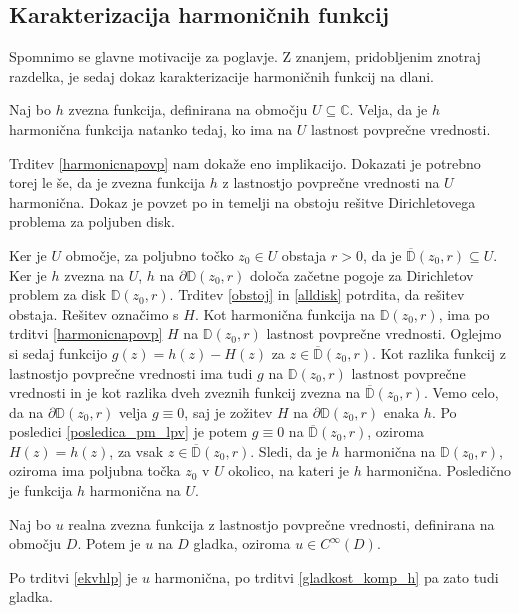 \documentclass[mat1, tisk]{fmfdelo}
\begin{document}
\subsection{Karakterizacija harmoničnih funkcij}
    Spomnimo se glavne motivacije za poglavje.
    Z znanjem, pridobljenim znotraj razdelka, je sedaj dokaz karakterizacije harmoničnih funkcij na dlani.
    
    \begin{trditev}
        \label{ekvhlp}
        Naj bo $h$ zvezna funkcija, definirana na območju $U \subseteq \mathbb{C}$. Velja, da je $h$ harmonična funkcija natanko tedaj, ko ima na $U$ lastnost povprečne vrednosti.
    \end{trditev}
    \begin{dokaz}
        Trditev \ref{harmonicnapovp} nam dokaže eno implikacijo. Dokazati je potrebno torej le še, da je zvezna funkcija $h$ z lastnostjo povprečne vrednosti na $U$ harmonična. 
        Dokaz je povzet po \cite[poglavje 10.2.]{gamelin} in temelji na obstoju rešitve Dirichletovega problema za poljuben disk. 
        
        Ker je $U$ območje, za poljubno točko $z_0 \in U$ obstaja $r>0$, da je $\overline{\mathbb{D}}(z_0,r) \subseteq U$. Ker je $h$ zvezna na $U$, $h$ na $\partial \mathbb{D}(z_0, r)$ določa začetne pogoje za Dirichletov problem za disk $\mathbb{D}(z_0,r)$.
        Trditev \ref{obstoj} in \ref{alldisk} potrdita, da rešitev obstaja. Rešitev označimo s $H$.
        Kot harmonična funkcija na $\mathbb{D}(z_0, r)$, ima po trditvi \ref{harmonicnapovp} $H$ na $\mathbb{D}(z_0, r)$ lastnost povprečne vrednosti. 
        Oglejmo si sedaj funkcijo $g(z) = h(z) - H(z)$ za $z \in \overline{\mathbb{D}}(z_0,r)$. 
        Kot razlika funkcij z lastnostjo povprečne vrednosti ima tudi $g$ na $\mathbb{D}(z_0, r)$ lastnost povprečne vrednosti in je kot razlika dveh zveznih funkcij zvezna na $\overline{\mathbb{D}}(z_0, r)$.
        Vemo celo, da na $\partial \mathbb{D}(z_0, r)$ velja $g \equiv 0$, saj je zožitev $H$ na $\partial \mathbb{D}(z_0,r)$ enaka $h$. 
        Po posledici \ref{posledica_pm_lpv} je potem $g \equiv 0$ na $\overline{\mathbb{D}}(z_0, r)$, oziroma $H(z) =  h(z)$, za vsak $z \in \overline{\mathbb{D}}(z_0, r)$. Sledi, da je $h$ harmonična na $\mathbb{D}(z_0, r)$, oziroma ima poljubna točka $z_0$ v $U$ okolico, na kateri je $h$ harmonična. 
        Posledično je funkcija $h$ harmonična na $U$.
    \end{dokaz}
    \begin{posledica}
        Naj bo $u$ realna zvezna funkcija z lastnostjo povprečne vrednosti, definirana na območju $D$. Potem je $u$ na $D$ gladka, oziroma $u \in C^{\infty}(D)$.
    \end{posledica}
    \begin{dokaz}
        Po trditvi \ref{ekvhlp} je $u$ harmonična, po trditvi \ref{gladkost_komp_h} pa zato tudi gladka.
    \end{dokaz}
\end{document}
